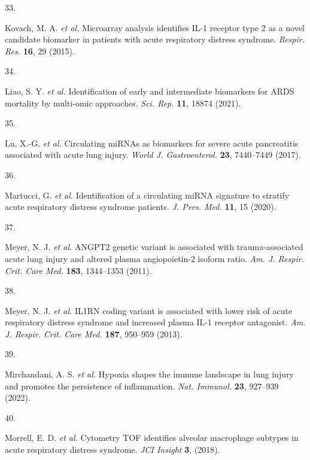 \documentclass[
  11,
  a4paper,
]{article}
\newlength{\cslhangindent}
\newlength{\csllabelwidth}
\newlength{\cslentryspacingunit} %
\newenvironment{CSLReferences}[2] %
 {%
  \setlength{\parindent}{0pt}
  \ifodd #1
  \let\oldpar\par
  \def\par{\hangindent=\cslhangindent\oldpar}
  \fi
  \setlength{\parskip}{#2\cslentryspacingunit}
 }%
 {}
\newcommand{\CSLLeftMargin}[1]{\parbox[t]{\csllabelwidth}{#1}}
\newcommand{\CSLRightInline}[1]{\parbox[t]{\linewidth - \csllabelwidth}{#1}\break}
\begin{document}
\begin{CSLReferences}{0}{0}
\leavevmode{}%
\CSLLeftMargin{33. }%
\CSLRightInline{Kovach, M. A. \emph{et al.} Microarray analysis
identifies {IL-1} receptor type 2 as a novel candidate biomarker in
patients with acute respiratory distress syndrome. \emph{Respir. Res.}
\textbf{16}, 29 (2015).}

\leavevmode{}%
\CSLLeftMargin{34. }%
\CSLRightInline{Liao, S. Y. \emph{et al.} Identification of early and
intermediate biomarkers for {ARDS} mortality by multi-omic approaches.
\emph{Sci. Rep.} \textbf{11}, 18874 (2021).}

\leavevmode{}%
\CSLLeftMargin{35. }%
\CSLRightInline{Lu, X.-G. \emph{et al.} Circulating {miRNAs} as
biomarkers for severe acute pancreatitis associated with acute lung
injury. \emph{World J. Gastroenterol.} \textbf{23}, 7440--7449 (2017).}

\leavevmode{}%
\CSLLeftMargin{36. }%
\CSLRightInline{Martucci, G. \emph{et al.} Identification of a
circulating {miRNA} signature to stratify acute respiratory distress
syndrome patients. \emph{J. Pers. Med.} \textbf{11}, 15 (2020).}

\leavevmode{}%
\CSLLeftMargin{37. }%
\CSLRightInline{Meyer, N. J. \emph{et al.} {ANGPT2} genetic variant is
associated with trauma-associated acute lung injury and altered plasma
angiopoietin-2 isoform ratio. \emph{Am. J. Respir. Crit. Care Med.}
\textbf{183}, 1344--1353 (2011).}

\leavevmode{}%
\CSLLeftMargin{38. }%
\CSLRightInline{Meyer, N. J. \emph{et al.} {IL1RN} coding variant is
associated with lower risk of acute respiratory distress syndrome and
increased plasma {IL-1} receptor antagonist. \emph{Am. J. Respir. Crit.
Care Med.} \textbf{187}, 950--959 (2013).}

\leavevmode{}%
\CSLLeftMargin{39. }%
\CSLRightInline{Mirchandani, A. S. \emph{et al.} Hypoxia shapes the
immune landscape in lung injury and promotes the persistence of
inflammation. \emph{Nat. Immunol.} \textbf{23}, 927--939 (2022).}

\leavevmode{}%
\CSLLeftMargin{40. }%
\CSLRightInline{Morrell, E. D. \emph{et al.} Cytometry {TOF} identifies
alveolar macrophage subtypes in acute respiratory distress syndrome.
\emph{JCI Insight} \textbf{3}, (2018).}


\end{CSLReferences}
\end{document}
